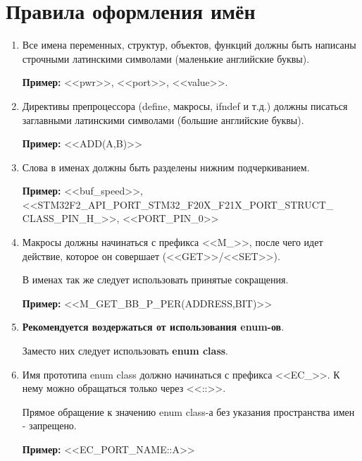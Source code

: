 \chapter{Правила оформления имён}\label{general:rules:0}
\begin{enumerate}
	\item Все имена переменных, структур, объектов, функций должны быть написаны строчными латинскими символами (маленькие английские буквы).
	
	\textbf{Пример: }<<pwr>>, <<port>>, <<value>>.
	\item Директивы препроцессора (define, макросы, ifndef и т.д.) должны писаться заглавными латинскими символами (большие английские буквы). 
	
	\textbf{Пример: }<<ADD(A,B)>>
	\item Слова в именах должны быть разделены нижним подчеркиванием.
	
	\textbf{Пример: }<<buf\_speed>>, <<STM32F2\-\_API\-\_PORT\-\_STM32\-\_F20X\-\_F21X\-\_PORT\-\_STRUCT\-\_\\CLASS\_PIN\-\_H\_>>, <<PORT\_PIN\_0>>
	\item Макросы должны начинаться с префикса <<M\_>>, после чего идет действие, которое он совершает (<<GET>>/<<SET>>).
	
	В именах так же следует использовать принятые сокращения.
	
	\textbf{Пример: }<<M\_GET\_BB\_P\_PER(ADDRESS,BIT)>>
	\item \textbf{Рекомендуется воздержаться от использования enum-ов}.
	
	Заместо них следует использовать \textbf{enum class}.
	\item Имя прототипа enum class должно начинаться с префикса <<EC\_>>. К нему можно обращаться только через <<::>>.
	
	Прямое обращение к значению enum class-а без указания пространства имен - запрещено.
	
	\textbf{Пример: }<<EC\_PORT\_NAME::A>>
\end{enumerate}
